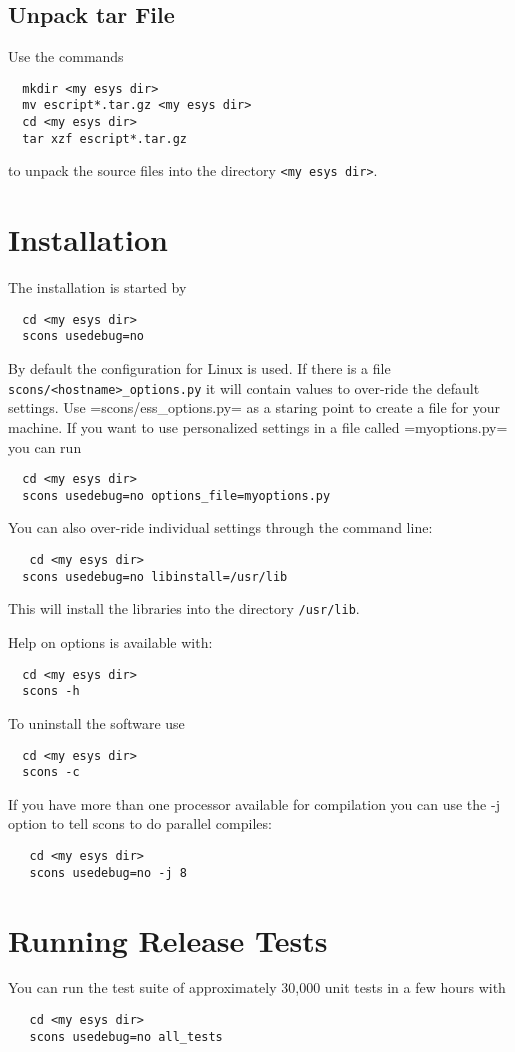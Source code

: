 \subsection{Unpack tar File}
  
Use the commands

\begin{verbatim}
  mkdir <my esys dir>
  mv escript*.tar.gz <my esys dir>
  cd <my esys dir>
  tar xzf escript*.tar.gz
\end{verbatim}

to unpack the source files into the directory \verb|<my esys dir>|.

\section{Installation}

The installation is started by 
\begin{verbatim}
  cd <my esys dir>
  scons usedebug=no
\end{verbatim}
By default the configuration for Linux is used. If there is a file \verb|scons/<hostname>_options.py| it will contain values to over-ride the default settings. Use =scons/ess_options.py= as a staring point to create a file for your machine. If you want to use personalized settings in a file called =myoptions.py= you can run
\begin{verbatim}
  cd <my esys dir>
  scons usedebug=no options_file=myoptions.py
\end{verbatim}
You can also over-ride individual settings through the command line:
\begin{verbatim}
   cd <my esys dir>
  scons usedebug=no libinstall=/usr/lib
\end{verbatim}
This will install the libraries into the directory \verb|/usr/lib|. 

Help on options is available with:
\begin{verbatim}
  cd <my esys dir>
  scons -h
\end{verbatim}
To uninstall the software use
\begin{verbatim}
  cd <my esys dir>
  scons -c
\end{verbatim}

If you have more than one processor available for compilation you can use the -j option to tell scons to do parallel compiles:
\begin{verbatim}
   cd <my esys dir>
   scons usedebug=no -j 8
\end{verbatim}
\section{Running Release Tests}
You can run the test suite of approximately 30,000 unit tests in a few hours with
\begin{verbatim}
   cd <my esys dir>
   scons usedebug=no all_tests
\end{verbatim}

